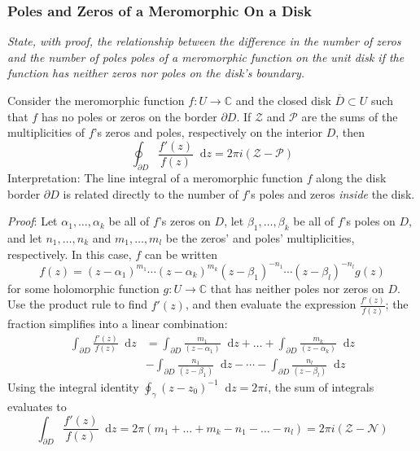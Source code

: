 \documentclass[11pt, a4paper]{article}
\newcommand{\question}[1]{\textit{#1}\vspace{2mm}}
\newcommand{\C}{\mathbb{C}} %
\newcommand{\diff}{\mathop{}\!\mathrm{d}} %
\begin{document}
\subsubsection{Poles and Zeros of a Meromorphic On a Disk}
\question{State, with proof, the relationship between the difference in the number of zeros and the number of poles poles of a meromorphic function on the unit disk if the function has neither zeros nor poles on the disk's boundary.}


Consider the meromorphic function $ f: U \to \C $ and the closed disk $ \overline{D} \subset U $ such that $ f $ has no poles or zeros on the border $ \partial D $. If $ \mathcal{Z} $ and $ \mathcal{P} $ are the sums of the multiplicities of $ f $'s zeros and poles, respectively on the interior $ D $, then
\begin{equation*}
	\oint_{\partial D}\frac{f'(z)}{f(z)}\diff z = 2\pi i (\mathcal{Z} - \mathcal{P})
\end{equation*}
Interpretation: The line integral of a meromorphic function $ f $ along the disk border $ \partial D $ is related directly to the number of $ f $'s poles and zeros \textit{inside} the disk.

\vspace{2mm}
\textit{Proof}:
Let $ \alpha_{1}, \ldots, \alpha_{k} $ be all of $ f $'s zeros on $ D $, let $ \beta_{1}, \ldots, \beta_{k} $ be all of $ f $'s poles on $ D $, and let $ n_{1}, \ldots, n_{k} $ and $ m_{1}, \ldots, m_{l} $ be the zeros' and poles' multiplicities, respectively. In this case, $ f $ can be written
\begin{equation*}
	f(z) = (z-\alpha_{1})^{m_{1}} \cdots (z - \alpha_{k})^{m_{k}} (z-\beta_{1})^{-n_{1}} \cdots (z - \beta_{l})^{-n_{l}} g(z)
\end{equation*}
for some holomorphic function $ g:U \to \C $ that has neither poles nor zeros on $ D $. Use the product rule to find $ f'(z) $, and then evaluate the expression $ \frac{f'(z)}{f(z)} $; the fraction simplifies into a linear combination:
\begin{align*}
	\int_{\partial D} \frac{f'(z)}{f(z)} \diff z &= \int_{\partial D} \frac{m_{1}}{(z-\alpha_{1})} \diff z + \dots + \int_{\partial D} \frac{m_{k}}{(z-\alpha_{k})} \diff z\\
	& - \int_{\partial D} \frac{n_{1}}{(z-\beta_{1})} \diff z - \cdots -  \int_{\partial D} \frac{n_{l}}{(z-\beta_{l})} \diff z
\end{align*}
Using the integral identity $ \oint_{\gamma}(z-z_{0})^{-1} \diff z = 2\pi i $, the sum of integrals evaluates to
\begin{equation*}
	\int_{\partial D} \frac{f'(z)}{f(z)} \diff z = 2\pi(m_{1} + \ldots + m_{k} - n_{1} - \ldots - n_{l}) = 2\pi i (\mathcal{Z} - \mathcal{N})
\end{equation*} 
\end{document}
